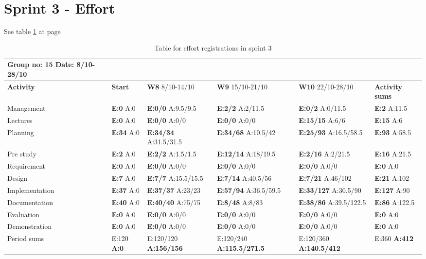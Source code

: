 \section{Sprint 3 - Effort}

See table \ref{tab:effortweekss3} at page \pageref{tab:effortweekss3}

\newpage

\begin{table}[htb]
\begin{tabularx}{\linewidth}{>{\setlength\hsize{.625\hsize}}X|>{\setlength\hsize{0.3\hsize}}X|>{\setlength\hsize{0.5\hsize}}X|>{\setlength\hsize{0.5\hsize}}X|>{\setlength\hsize{0.5\hsize}}X|>{\setlength\hsize{.3\hsize}}X}
Group no: 15 Date: 8/10-28/10  \\ \hline
\textbf{Activity} & \textbf{Start} & \textbf{W8} 8/10-14/10 & \textbf{W9} 15/10-21/10 & \textbf{W10} 22/10-28/10 & \textbf{Activity sums} \\ \hline \hline
Management & \textbf{E:0} A:0 & \textbf{E:0/0} A:9.5/9.5 & \textbf{E:2/2} A:2/11.5 & \textbf{E:0/2} A:0/11.5 & \textbf{E:2} A:11.5  \\ \hline
Lectures & \textbf{E:0} A:0 & \textbf{E:0/0} A:0/0 & \textbf{E:0/0} A:0/0 & \textbf{E:15/15} A:6/6 & \textbf{E:15} A:6  \\ \hline
Planning & \textbf{E:34} A:0 & \textbf{E:34/34} A:31.5/31.5 & \textbf{E:34/68} A:10.5/42 & \textbf{E:25/93} A:16.5/58.5 & \textbf{E:93} A:58.5  \\ \hline
Pre study & \textbf{E:2} A:0 & \textbf{E:2/2} A:1.5/1.5 & \textbf{E:12/14} A:18/19.5 & \textbf{E:2/16} A:2/21.5 & \textbf{E:16} A:21.5  \\ \hline
Requirement & \textbf{E:0} A:0 & \textbf{E:0/0} A:0/0 & \textbf{E:0/0} A:0/0 & \textbf{E:0/0} A:0/0 & \textbf{E:0} A:0 \\ \hline
Design & \textbf{E:7} A:0 & \textbf{E:7/7} A:15.5/15.5 & \textbf{E:7/14} A:40.5/56 & \textbf{E:7/21} A:46/102 & \textbf{E:21} A:102  \\ \hline
Implementation & \textbf{E:37} A:0 & \textbf{E:37/37} A:23/23 & \textbf{E:57/94} A:36.5/59.5 & \textbf{E:33/127} A:30.5/90 & \textbf{E:127} A:90  \\ \hline
Documentation & \textbf{E:40} A:0 & \textbf{E:40/40} A:75/75 & \textbf{E:8/48} A:8/83 & \textbf{E:38/86} A:39.5/122.5 & \textbf{E:86} A:122.5  \\ \hline
Evaluation & \textbf{E:0} A:0 & \textbf{E:0/0} A:0/0 & \textbf{E:0/0} A:0/0 & \textbf{E:0/0} A:0/0 & \textbf{E:0 } A:0  \\ \hline
Demonstration & \textbf{E:0} A:0 & \textbf{E:0/0} A:0/0 & \textbf{E:0/0} A:0/0 & \textbf{E:0/0} A:0/0 & \textbf{E:0 } A:0  \\ \hline
Period sums & E:120 \textbf{A:0} & E:120/120 \textbf{A:156/156} & E:120/240 \textbf{A:115.5/271.5} & E:120/360 \textbf{A:140.5/412} & E:360 \textbf{A:412} \\ \hline
\end{tabularx}

\caption{Table for effort registrations in sprint 3} \label{tab:effortweekss3}
\end{table}

